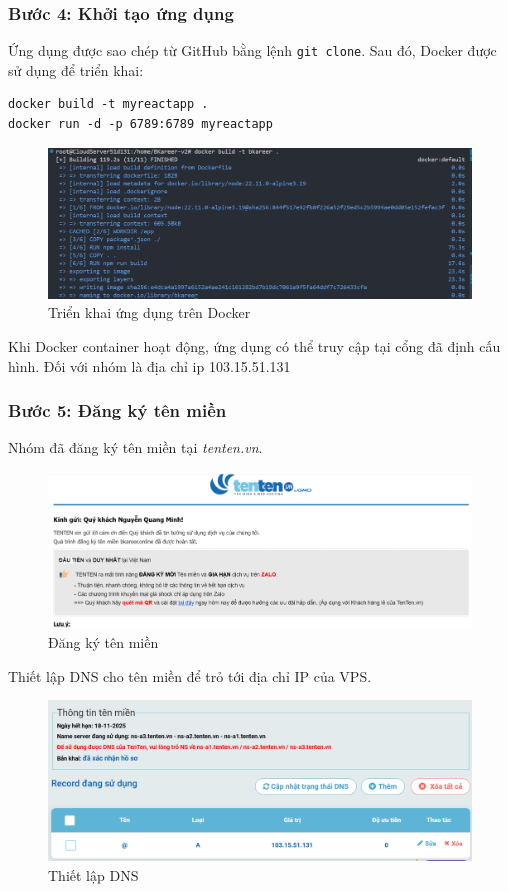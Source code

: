 \subsubsection{Bước 4: Khởi tạo ứng dụng}
Ứng dụng được sao chép từ GitHub bằng lệnh \texttt{git clone}. Sau đó, Docker được sử dụng để triển khai:
\begin{verbatim}
docker build -t myreactapp .
docker run -d -p 6789:6789 myreactapp
\end{verbatim}

\begin{figure}[H]
    \centering
    \includegraphics[width=0.9\linewidth]{images/docker build.png}
    \vspace{0.5cm}
    \caption{Triển khai ứng dụng trên Docker}
\end{figure}

Khi Docker container hoạt động, ứng dụng có thể truy cập tại cổng đã định cấu hình. Đối với nhóm là địa chỉ ip 103.15.51.131

\subsubsection{Bước 5: Đăng ký tên miền}
Nhóm đã đăng ký tên miền tại \textit{tenten.vn}. 
\begin{figure}[H]
    \centering
    \includegraphics[width=0.9\linewidth]{images/domain.png}
    \vspace{0.5cm}
    \caption{Đăng ký tên miền}
\end{figure}    
Thiết lập DNS cho tên miền để trỏ tới địa chỉ IP của VPS.
\begin{figure}[H]
    \centering
    \includegraphics[width=0.9\linewidth]{images/dns.png}
    \vspace{0.5cm}
    \caption{Thiết lập DNS}
\end{figure}


